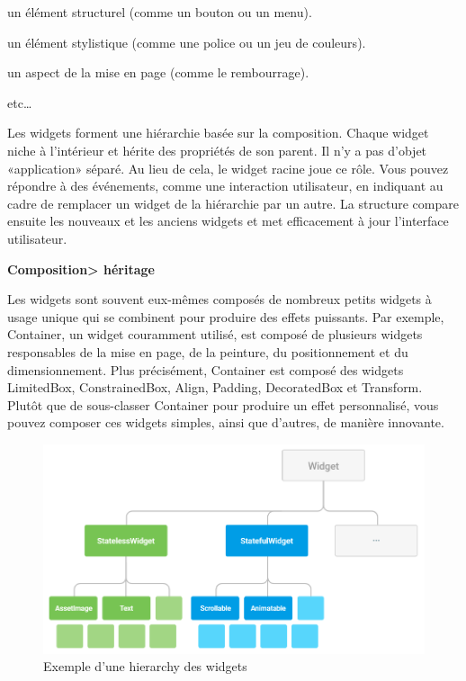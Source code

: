 \begin{list}{•}{}
	\item un élément structurel (comme un bouton ou un menu).
	\item un élément stylistique (comme une police ou un jeu de couleurs).
	\item un aspect de la mise en page (comme le rembourrage).
	\item etc…
\end{list}

Les widgets forment une hiérarchie basée sur la composition. Chaque widget niche à l'intérieur et hérite des propriétés de son parent. Il n'y a pas d'objet «application» séparé. Au lieu de cela, le widget racine joue ce rôle.
Vous pouvez répondre à des événements, comme une interaction utilisateur, en indiquant au cadre de remplacer un widget de la hiérarchie par un autre. La structure compare ensuite les nouveaux et les anciens widgets et met efficacement à jour l'interface utilisateur.\bigskip

\longtab \textbf{Composition> héritage\medskip}

Les widgets sont souvent eux-mêmes composés de nombreux petits widgets à usage unique qui se combinent pour produire des effets puissants. Par exemple, Container, un widget couramment utilisé, est composé de plusieurs widgets responsables de la mise en page, de la peinture, du positionnement et du dimensionnement. Plus précisément, Container est composé des widgets LimitedBox, ConstrainedBox, Align, Padding, DecoratedBox et Transform. Plutôt que de sous-classer Container pour produire un effet personnalisé, vous pouvez composer ces widgets simples, ainsi que d'autres, de manière innovante.\medskip

\begin{figure}[h]
	\begin{center}
		\includegraphics[width=13cm]{Images/chapter2/hierarchy_widgets.png}
		\caption{{\footnotesize Exemple d'une hierarchy des widgets\cite{noauthor_technical_nodate}}}
	\end{center}
\end{figure}

